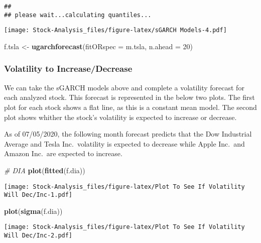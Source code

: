 \documentclass[
]{article}
\newenvironment{Shaded}{\begin{snugshade}}{\end{snugshade}}
\newcommand{\CommentTok}[1]{\textcolor[rgb]{0.56,0.35,0.01}{\textit{#1}}}
\newcommand{\DataTypeTok}[1]{\textcolor[rgb]{0.13,0.29,0.53}{#1}}
\newcommand{\DecValTok}[1]{\textcolor[rgb]{0.00,0.00,0.81}{#1}}
\newcommand{\KeywordTok}[1]{\textcolor[rgb]{0.13,0.29,0.53}{\textbf{#1}}}
\newcommand{\NormalTok}[1]{#1}
\newcommand{\StringTok}[1]{\textcolor[rgb]{0.31,0.60,0.02}{#1}}
\begin{document}
\begin{verbatim}
## 
## please wait...calculating quantiles...
\end{verbatim}

\texttt{[image: Stock-Analysis\_files/figure-latex/sGARCH Models-4.pdf]}

\begin{Shaded}
\begin{Highlighting}[]
\NormalTok{f.tsla <-}\StringTok{ }\KeywordTok{ugarchforecast}\NormalTok{(}\DataTypeTok{fitORspec =}\NormalTok{ m.tsla,}
                    \DataTypeTok{n.ahead =} \DecValTok{20}\NormalTok{)}
\end{Highlighting}
\end{Shaded}

\hypertarget{volatility-to-increasedecrease}{%
\subsubsection{Volatility to
Increase/Decrease}\label{volatility-to-increasedecrease}}

We can take the sGARCH models above and complete a volatility forecast
for each analyzed stock. This forecast is represented in the below two
plots. The first plot for each stock shows a flat line, as this is a
constant mean model. The second plot shows whither the stock's
volatility is expected to increase or decrease.

As of 07/05/2020, the following month forecast predicts that the Dow
Industrial Average and Tesla Inc.~volatility is expected to decrease
while Apple Inc.~and Amazon Inc.~are expected to increase.

\begin{Shaded}
\begin{Highlighting}[]
\CommentTok{# DIA}
\KeywordTok{plot}\NormalTok{(}\KeywordTok{fitted}\NormalTok{(f.dia))}
\end{Highlighting}
\end{Shaded}

\texttt{[image: Stock-Analysis\_files/figure-latex/Plot To See If Volatility Will Dec/Inc-1.pdf]}

\begin{Shaded}
\begin{Highlighting}[]
\KeywordTok{plot}\NormalTok{(}\KeywordTok{sigma}\NormalTok{(f.dia))}
\end{Highlighting}
\end{Shaded}

\texttt{[image: Stock-Analysis\_files/figure-latex/Plot To See If Volatility Will Dec/Inc-2.pdf]}
\end{document}
